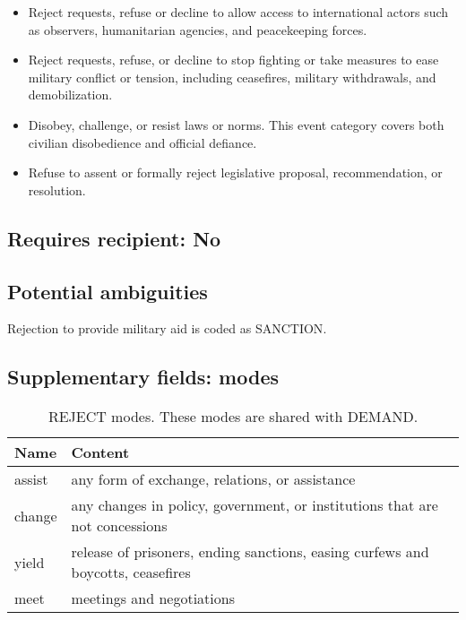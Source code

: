 \documentclass[11pt]{report}
\newcommand{\plcat}[1]{\textsf{#1}}
\begin{document}
\begin{itemize}
\item Reject requests, refuse or decline to allow access to international actors such as observers, humanitarian agencies, and peacekeeping forces.
\item Reject requests, refuse, or decline to stop fighting or take measures to ease military conflict or tension, including ceasefires, military withdrawals, and demobilization.
\item Disobey, challenge, or resist laws or norms. This event category covers both civilian disobedience and official defiance.
\item Refuse to assent or formally reject legislative proposal, recommendation, or resolution.
\end{itemize}

\subsection{Requires recipient: No}

\subsection{Potential ambiguities}

Rejection to provide military aid is coded as \plcat{SANCTION}.


\subsection{Supplementary fields: modes}

\begin{table}[htp]
\caption{\plcat{REJECT} modes. These modes are shared with \plcat{DEMAND}.}
\begin{center}
\begin{tabular}{|l|p{13cm}|}
\hline
Name & Content \\
\hline
assist & any form of exchange, relations, or assistance\\
change & any changes in policy, government, or institutions that are not concessions \\
yield & release of prisoners, ending sanctions, easing curfews and boycotts, ceasefires\\
meet & meetings and negotiations\\
\hline
\end{tabular}
\end{center}
\label{tab:rejectmode}
\end{table}%
\end{document}
